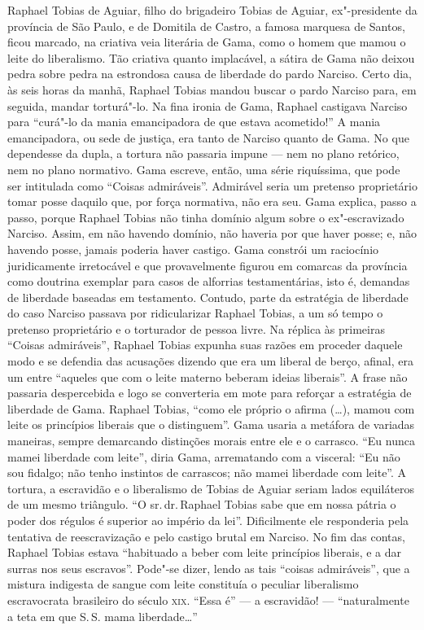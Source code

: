 {\small\noindent
Raphael Tobias de Aguiar, filho do brigadeiro Tobias de Aguiar,
ex"-presidente da província de São Paulo, e de Domitila de Castro, a
famosa marquesa de Santos, ficou marcado, na criativa veia literária de
Gama, como o homem que mamou o leite do liberalismo. Tão criativa quanto
implacável, a sátira de Gama não deixou pedra sobre pedra na estrondosa
causa de liberdade
do pardo Narciso. Certo dia, às seis horas da manhã, Raphael Tobias
mandou buscar o pardo Narciso para, em seguida, mandar torturá"-lo. Na
fina ironia de Gama, Raphael castigava Narciso para ``curá"-lo da mania
emancipadora de que estava acometido!'' A mania emancipadora, ou sede de
justiça, era tanto de Narciso quanto de Gama. No que dependesse da
dupla, a tortura não passaria impune --- nem no plano retórico, nem no
plano normativo. Gama escreve, então, uma série riquíssima, que pode ser
intitulada como ``Coisas admiráveis''. Admirável
seria um pretenso proprietário tomar posse daquilo que,
por força normativa, não era seu. Gama explica, passo a passo, porque
Raphael Tobias não tinha domínio algum sobre o ex"-escravizado Narciso.
Assim, em não havendo domínio, não haveria por que haver posse; e, não
havendo posse, jamais poderia haver castigo. Gama constrói um raciocínio
juridicamente irretocável e que provavelmente figurou em comarcas da
província como doutrina exemplar para casos de alforrias testamentárias,
isto é, demandas de liberdade baseadas em testamento. Contudo, parte da
estratégia de liberdade do caso Narciso passava por ridicularizar
Raphael Tobias, a um só tempo o pretenso proprietário e o torturador de
pessoa livre. Na réplica às primeiras ``Coisas admiráveis'', Raphael
Tobias expunha suas razões em proceder daquele modo e se defendia das
acusações dizendo que era um liberal de berço, afinal, era um entre
``aqueles que com o leite materno beberam ideias liberais''. A frase não
passaria despercebida e logo se converteria em mote para reforçar a
estratégia de liberdade de Gama. Raphael Tobias, ``como ele próprio o
afirma (\ldots{}), mamou com leite os princípios liberais que o distinguem''.
Gama usaria a metáfora de variadas maneiras, sempre
demarcando distinções morais entre ele e o carrasco. ``Eu nunca mamei
liberdade com leite'', diria Gama, arrematando com
a visceral: ``Eu não sou fidalgo; não tenho instintos de carrascos; não
mamei liberdade com leite''. A tortura, a escravidão e o liberalismo de
Tobias de Aguiar seriam lados equiláteros de um mesmo triângulo. ``O sr.\,dr.\,Raphael Tobias sabe que em nossa pátria o poder dos régulos é
superior ao império da lei''. Dificilmente ele responderia pela tentativa
de reescravização e pelo castigo brutal em Narciso. No fim das contas,
Raphael Tobias estava ``habituado a beber com leite princípios liberais,
e a dar surras nos seus escravos''. Pode"-se dizer, lendo as tais ``coisas
admiráveis'', que a mistura indigesta de sangue com leite constituía o
peculiar liberalismo escravocrata brasileiro do século \textsc{xix}. ``Essa é'' ---
a escravidão! --- ``naturalmente a teta em que S.\,S. mama liberdade\ldots{}''}
\@openrighttrue\makeatother \endgroup



